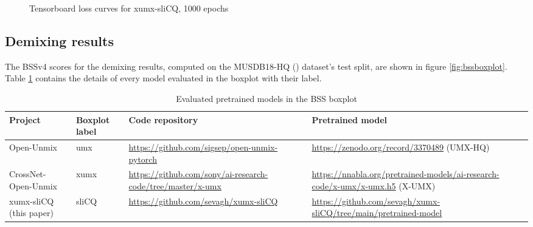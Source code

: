 \documentclass[report.tex]{subfiles}
\begin{document}
\begin{figure}[ht]
	\centering
	\hspace{0.5em}
	\caption{Tensorboard loss curves for xumx-sliCQ, 1000 epochs}
	\label{fig:networkloss}
\end{figure}

\newpagefill

\subsection{Demixing results}

The BSSv4 scores for the demixing results, computed on the MUSDB18-HQ (\cite{musdb18hq}) dataset's test split, are shown in figure \ref{fig:bssboxplot}. Table \ref{table:bsseval} contains the details of every model evaluated in the boxplot with their label.

\begin{table}[ht]
	\centering
	\begin{tabular}{ |l|l|p{4cm}|p{4cm}| }
	 \hline
	  Project & Boxplot label & Code repository & Pretrained model \\
	 \hline
	 \hline
		\makecell[l]{Open-Unmix \\ \textcite{umx}} & umx & \url{https://github.com/sigsep/open-unmix-pytorch} & \url{https://zenodo.org/record/3370489} (UMX-HQ) \\
	 \hline
		\makecell[l]{CrossNet-Open-Unmix \\ \textcite{xumx}} & xumx & \url{https://github.com/sony/ai-research-code/tree/master/x-umx} & \url{https://nnabla.org/pretrained-models/ai-research-code/x-umx/x-umx.h5} (X-UMX) \\
	 \hline
		\makecell[l]{xumx-sliCQ \\ (this paper)} & sliCQ & \url{https://github.com/sevagh/xumx-sliCQ} & \url{https://github.com/sevagh/xumx-sliCQ/tree/main/pretrained-model} \\
	 \hline
\end{tabular}
	\caption{Evaluated pretrained models in the BSS boxplot}
	\label{table:bsseval}
\end{table}
\end{document}
